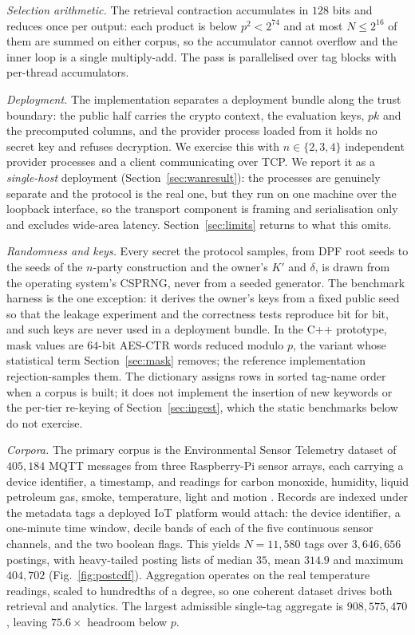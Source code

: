 \documentclass[a4paper,fleqn]{cas-sc}
\begin{document}
\emph{Selection arithmetic.} The retrieval contraction accumulates in $128$
bits and reduces once per output: each product is below $p^2<2^{74}$ and at
most $N\le 2^{16}$ of them are summed on either corpus, so the accumulator
cannot overflow and the inner loop is a single multiply-add. The pass is
parallelised over tag blocks with per-thread accumulators.

\emph{Deployment.} The implementation separates a deployment bundle along
the trust boundary: the public half carries the crypto context, the evaluation keys,
$pk$ and the precomputed columns, and the provider process loaded from it
holds no secret key and refuses decryption. We exercise this with
$n\in\{2,3,4\}$ independent provider processes and a client communicating over
TCP. We report it as a \emph{single-host} deployment
(Section~\ref{sec:wanresult}): the processes are genuinely separate and the
protocol is the real one, but they run on one machine over the loopback
interface, so the transport component is framing and serialisation only and
excludes wide-area latency. Section~\ref{sec:limits} returns to what this
omits.

\emph{Randomness and keys.} Every secret the protocol samples, from DPF root
seeds to the seeds of the $n$-party construction and the owner's $K'$ and
$\delta$, is drawn from the operating system's CSPRNG, never from a seeded
generator. The benchmark harness is the one exception: it derives the owner's
keys from a fixed public seed so that the leakage experiment and the
correctness tests reproduce bit for bit, and such keys are never used in a
deployment bundle. In the C++ prototype, mask values are $64$-bit AES-CTR
words reduced modulo $p$, the variant whose statistical term
Section~\ref{sec:mask} removes; the reference implementation rejection-samples
them. The dictionary assigns rows in
sorted tag-name order when a corpus is built; it does not implement the
insertion of new keywords or the per-tier re-keying of
Section~\ref{sec:ingest}, which the static benchmarks below do not exercise.

\emph{Corpora.} The primary corpus is the Environmental Sensor Telemetry
dataset of $405{,}184$ MQTT messages from three Raspberry-Pi sensor arrays,
each carrying a device identifier, a timestamp, and readings for carbon
monoxide, humidity, liquid petroleum gas, smoke, temperature, light and motion
\citep{stafford_2020_environmental}. Records are indexed under the metadata
tags a deployed IoT platform would attach: the device identifier, a one-minute
time window, decile bands of each of the five continuous sensor channels, and
the two boolean flags. This yields $N=11{,}580$ tags over $3{,}646{,}656$
postings, with heavy-tailed posting lists of median $35$, mean $314.9$ and
maximum $404{,}702$ (Fig.~\ref{fig:postcdf}). Aggregation operates on the real
temperature readings, scaled to hundredths of a degree, so one coherent
dataset drives both retrieval and analytics. The largest admissible single-tag
aggregate is $908{,}575{,}470$, leaving $75.6\times$ headroom below $p$.
\end{document}
